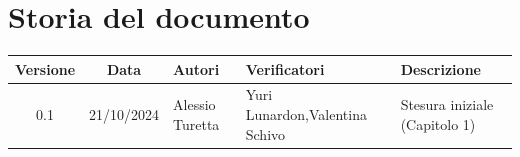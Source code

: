 \section{Storia del documento}
\begin{tabularx}{\textwidth}{ c c p{2.75cm} p{2.75cm} X }
    \rowcolor{gray!20}\rule{0pt}{0.5cm}\textbf{Versione} & \textbf{Data} & \textbf{Autori} & \textbf{Verificatori} & \textbf{Descrizione} \\[0.7ex]
    \hline
    \rule{0pt}{0.5cm}0.1 & 21/10/2024 & Alessio Turetta & Yuri Lunardon,\newline Valentina Schivo & Stesura iniziale (Capitolo 1)\\[0.7ex]
\end{tabularx}